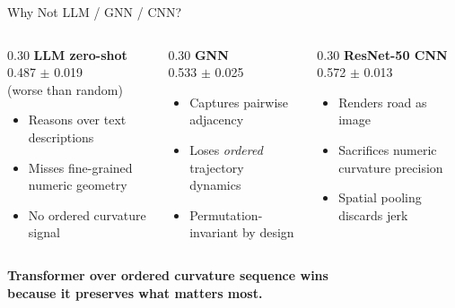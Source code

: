 \documentclass[aspectratio=169,10pt]{beamer}
\newcommand{\hlg}[1]{\textcolor{successgreen}{\textbf{#1}}}
\newcommand{\hlr}[1]{\textcolor{alertred}{\textbf{#1}}}
\begin{document}
\begin{frame}{Why Not LLM / GNN / CNN?}
  \begin{columns}[T]
    \begin{column}{0.30\linewidth}
      \textbf{\hlr{LLM zero-shot}}\\[4pt]
      0.487 $\pm$ 0.019\\{\small (worse than random)}
      \vspace{6pt}
      \begin{itemize}
        \item Reasons over text descriptions
        \item Misses fine-grained numeric geometry
        \item No ordered curvature signal
      \end{itemize}
    \end{column}
    \begin{column}{0.30\linewidth}
      \textbf{\hlr{GNN}}\\[4pt]
      0.533 $\pm$ 0.025
      \vspace{6pt}
      \begin{itemize}
        \item Captures pairwise adjacency
        \item Loses \emph{ordered} trajectory dynamics
        \item Permutation-invariant by design
      \end{itemize}
    \end{column}
    \begin{column}{0.30\linewidth}
      \textbf{\hlr{ResNet-50 CNN}}\\[4pt]
      0.572 $\pm$ 0.013
      \vspace{6pt}
      \begin{itemize}
        \item Renders road as image
        \item Sacrifices numeric curvature precision
        \item Spatial pooling discards jerk
      \end{itemize}
    \end{column}
  \end{columns}
  \vspace{10pt}
  \begin{center}
  \large
  \hlg{Transformer over ordered curvature sequence wins\\because it preserves what matters most.}
  \end{center}
\end{frame}
\end{document}
